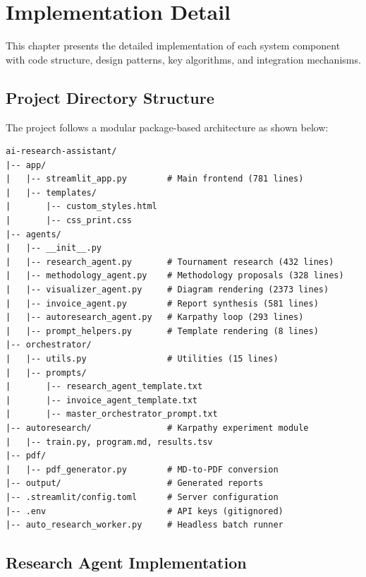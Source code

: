 \chapter{Implementation Detail}

This chapter presents the detailed implementation of each system component with code structure, design patterns, key algorithms, and integration mechanisms.

\section{Project Directory Structure}

The project follows a modular package-based architecture as shown below:

\begin{lstlisting}[language={}, caption={Project Directory Structure}, label={lst:structure}]
ai-research-assistant/
|-- app/
|   |-- streamlit_app.py        # Main frontend (781 lines)
|   |-- templates/
|       |-- custom_styles.html
|       |-- css_print.css
|-- agents/
|   |-- __init__.py
|   |-- research_agent.py       # Tournament research (432 lines)
|   |-- methodology_agent.py    # Methodology proposals (328 lines)
|   |-- visualizer_agent.py     # Diagram rendering (2373 lines)
|   |-- invoice_agent.py        # Report synthesis (581 lines)
|   |-- autoresearch_agent.py   # Karpathy loop (293 lines)
|   |-- prompt_helpers.py       # Template rendering (8 lines)
|-- orchestrator/
|   |-- utils.py                # Utilities (15 lines)
|   |-- prompts/
|       |-- research_agent_template.txt
|       |-- invoice_agent_template.txt
|       |-- master_orchestrator_prompt.txt
|-- autoresearch/               # Karpathy experiment module
|   |-- train.py, program.md, results.tsv
|-- pdf/
|   |-- pdf_generator.py        # MD-to-PDF conversion
|-- output/                     # Generated reports
|-- .streamlit/config.toml      # Server configuration
|-- .env                        # API keys (gitignored)
|-- auto_research_worker.py     # Headless batch runner
\end{lstlisting}

\section{Research Agent Implementation}

